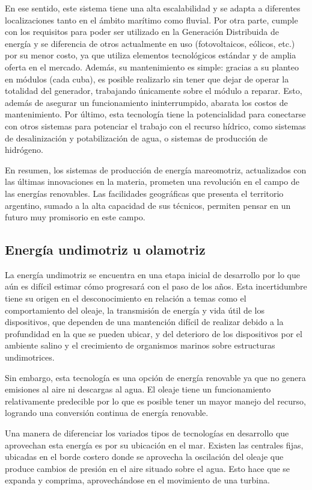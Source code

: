 \documentclass[12pt,letterpaper,superscriptaddress]{article}
\begin{document}
En ese sentido, este sistema tiene una alta escalabilidad y se adapta a diferentes localizaciones tanto en el ámbito marítimo como fluvial. Por otra parte, cumple con los requisitos para poder ser utilizado en la Generación Distribuida de energía y se diferencia de otros actualmente en uso (fotovoltaicos, eólicos, etc.) por su menor costo, ya que utiliza elementos tecnológicos estándar y de amplia oferta en el mercado. Además, su mantenimiento es simple: gracias a su planteo en módulos (cada cuba), es posible realizarlo sin tener que dejar de operar la totalidad del generador, trabajando únicamente sobre el módulo a reparar. Esto, además de asegurar un funcionamiento ininterrumpido, abarata los costos de mantenimiento.
Por último, esta tecnología tiene la potencialidad para conectarse con otros sistemas para potenciar el trabajo con el recurso hídrico, como sistemas de desalinización y potabilización de agua, o sistemas de producción de hidrógeno.

En resumen, los sistemas de producción de energía mareomotriz, actualizados con las últimas innovaciones en la materia, prometen una revolución en el campo de las energías renovables. Las facilidades geográficas que presenta el territorio argentino, sumado a la alta capacidad de sus técnicos, permiten pensar en un futuro muy promisorio en este campo.

\subsection{Energía undimotriz u olamotriz}

La energía undimotriz se encuentra en una etapa inicial de desarrollo por lo que aún es difícil estimar cómo progresará con el paso de los años. Esta incertidumbre tiene su origen en el desconocimiento en relación a temas como el comportamiento del oleaje, la transmisión de energía y vida útil de los dispositivos, que dependen de una mantención difícil de realizar debido a la profundidad en la que se pueden ubicar, y del deterioro de los dispositivos por el ambiente salino y el crecimiento de organismos marinos sobre estructuras undimotrices.

Sin embargo, esta tecnología es una opción de energía renovable ya que no genera emisiones al aire ni descargas al agua. El oleaje tiene un funcionamiento relativamente predecible por lo que es posible tener un mayor manejo del recurso, logrando una conversión continua de energía renovable.

Una manera de diferenciar los variados tipos de tecnologías en desarrollo que aprovechan esta energía es por su ubicación en el mar. Existen las centrales fijas, ubicadas en el borde costero donde se aprovecha la oscilación del oleaje que produce cambios de presión en el aire situado sobre el agua. Esto hace que se expanda y comprima, aprovechándose en el movimiento de una turbina.
\end{document}
